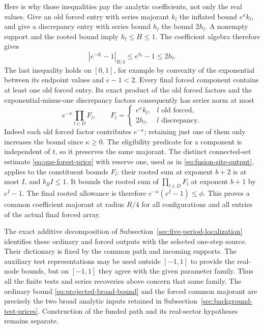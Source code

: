 Here is why those inequalities pay the analytic coefficients,
not only the real values. Give an old forced entry with series
majorant $k_l$ the inflated bound $e^\kappa k_l$, and give a
discrepancy entry with series bound $h_l$ the bound $2h_l$.
A nonempty support and the rooted bound imply $h_l\le H\le1$.
The coefficient algebra therefore gives
\[
                 |e^{-d_l}-1|_{R/4}
                     \le e^{h_l}-1\le2h_l.
\]
The last inequality holds on $[0,1]$, for example by convexity
of the exponential between its endpoint values and $e-1<2$.
Every final forced component contains at least one old forced
entry. Its exact product of the old forced factors and the
exponential-minus-one discrepancy factors consequently has
series norm at most
\[
                 e^{-\kappa}\prod_{l\in D} F_l,
 \qquad F_l=\begin{cases}e^\kappa k_l,&l\text{ old forced},\\
                              2h_l,&l\text{ discrepancy}.
             \end{cases}
\]
Indeed each old forced factor contributes $e^{-\kappa}$;
retaining just one of them only increases the bound since
$\kappa\ge0$. The eligibility predicate for a component is
independent of $t$, so it preserves the same majorant. The
distinct connected-set estimate \eqref{eq:ope-forest-price} with
reserve one, used as in \eqref{eq:fusion-site-output}, applies to
the constituent bounds $F_l$: their rooted sum at exponent $b+2$ is
at most $I$, and $b_BI\le1$. It bounds the rooted sum of
$\prod_{l\in D}F_l$ at exponent $b+1$ by $e^I-1$. The final rooted
allowance is therefore $e^{-\kappa}(e^I-1)\le\phi$. This proves a
common coefficient majorant at radius $R/4$ for all configurations
and all entries of the actual final forced array.

The exact additive decomposition of
Subsection~\ref{sec:five-period-localization} identifies these
ordinary and forced outputs with the selected one-step source.
Their dictionary is fixed by the common path and incoming
supports. The auxiliary test representations may be used outside
$[-1,1]$ to provide the real-node bounds, but on $[-1,1]$ they
agree with the given parameter family. Thus all the finite tests
and series recoveries above concern that same family. The ordinary
bound \eqref{eq:projected-broad-bound} and the forced common
majorant are precisely the two broad analytic inputs retained in
Subsection~\ref{sec:background-test-prices}. Construction of the
funded path and its real-sector hypotheses remains separate.

